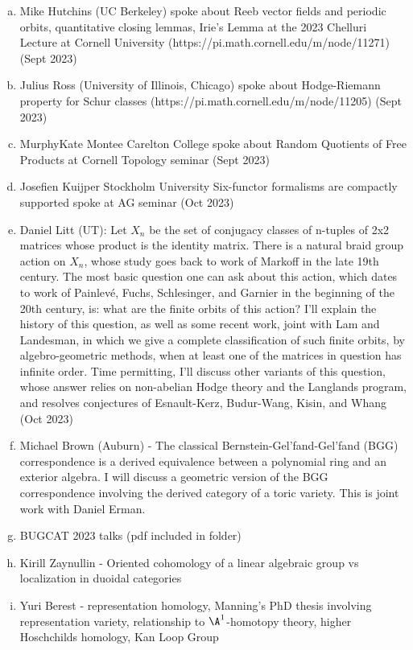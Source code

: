 \documentclass[12pt]{article}
\begin{document}
\begin{enumerate}[(a)]
    \item Mike Hutchins (UC Berkeley) spoke about Reeb vector fields and periodic orbits, quantitative closing lemmas, Irie's Lemma at the 2023 Chelluri Lecture at Cornell University (https://pi.math.cornell.edu/m/node/11271) (Sept 2023) 
    \item Julius Ross (University of Illinois, Chicago) spoke about Hodge-Riemann property for Schur classes (https://pi.math.cornell.edu/m/node/11205) (Sept 2023) 
    \item MurphyKate Montee Carelton College spoke about Random Quotients of Free Products at Cornell Topology seminar (Sept 2023)
    \item Josefien Kuijper Stockholm University Six-functor formalisms are compactly supported spoke at AG seminar (Oct 2023)
    \item Daniel Litt (UT): Let $X_n$ be the set of conjugacy classes of n-tuples of 2x2 matrices whose product is the identity matrix. There is a natural braid group action on $X_n$, whose study goes back to work of Markoff in the late 19th century. The most basic question one can ask about this action, which dates to work of Painlevé, Fuchs, Schlesinger, and Garnier in the beginning of the 20th century, is: what are the finite orbits of this action? I'll explain the history of this question, as well as some recent work, joint with Lam and Landesman, in which we give a complete classification of such finite orbits, by algebro-geometric methods, when at least one of the matrices in question has infinite order. Time permitting, I'll discuss other variants of this question, whose answer relies on non-abelian Hodge theory and the Langlands program, and resolves conjectures of Esnault-Kerz, Budur-Wang, Kisin, and Whang (Oct 2023)
    \item Michael Brown (Auburn) - The classical Bernstein-Gel’fand-Gel’fand (BGG) correspondence is a derived equivalence between a polynomial ring and an exterior algebra. I will discuss a geometric version of the BGG correspondence involving the derived category of a toric variety. This is joint work with Daniel Erman.
    \item BUGCAT 2023 talks (pdf included in folder)
    \item Kirill Zaynullin - Oriented cohomology of a linear algebraic group vs localization in duoidal categories
    \item Yuri Berest - representation homology, Manning's PhD thesis involving representation variety, relationship to $\A^1$-homotopy theory, higher Hoschchilds homology, Kan Loop Group
\end{enumerate}
\end{document}
